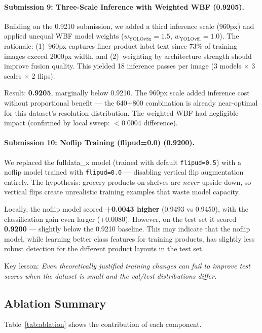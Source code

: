 \documentclass[11pt,a4paper]{article}
\begin{document}
\paragraph{Submission 9: Three-Scale Inference with Weighted WBF (0.9205).}
Building on the 0.9210 submission, we added a third inference scale (960px) and applied unequal WBF model weights ($w_{\text{YOLOv8x}} = 1.5$, $w_{\text{YOLOv8l}} = 1.0$). The rationale: (1)~960px captures finer product label text since 73\% of training images exceed 2000px width, and (2)~weighting by architecture strength should improve fusion quality. This yielded 18 inference passes per image (3 models $\times$ 3 scales $\times$ 2 flips).

Result: \textbf{0.9205}, marginally below 0.9210. The 960px scale added inference cost without proportional benefit --- the 640+800 combination is already near-optimal for this dataset's resolution distribution. The weighted WBF had negligible impact (confirmed by local sweep: $<$0.0004 difference).

\paragraph{Submission 10: Noflip Training (flipud=0.0) (0.9200).}
We replaced the fulldata\_x model (trained with default \texttt{flipud=0.5}) with a noflip model trained with \texttt{flipud=0.0} --- disabling vertical flip augmentation entirely. The hypothesis: grocery products on shelves are \emph{never} upside-down, so vertical flips create unrealistic training examples that waste model capacity.

Locally, the noflip model scored \textbf{+0.0043 higher} (0.9493 vs 0.9450), with the classification gain even larger (+0.0080). However, on the test set it scored \textbf{0.9200} --- slightly below the 0.9210 baseline. This may indicate that the noflip model, while learning better class features for training products, has slightly less robust detection for the different product layouts in the test set.

Key lesson: \emph{Even theoretically justified training changes can fail to improve test scores when the dataset is small and the val/test distributions differ.}

\subsection{Ablation Summary}

Table~\ref{tab:ablation} shows the contribution of each component.
\end{document}
